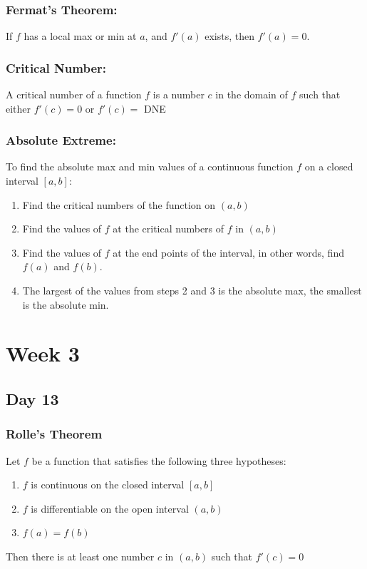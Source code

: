 \documentclass[12pt]{article}
\begin{document}
\subsubsection{Fermat's Theorem:} If $f$ has a local max or min at $a$, and $f'(a)$ exists, then $f'(a) = 0$.

\subsubsection{Critical Number: } A critical number of a function $f$ is a number $c$ in the domain of $f$ such that either $f'(c) = 0$ or $f'(c) = $ DNE

\subsubsection{Absolute Extreme: } To find the absolute max and min values of a continuous function $f$ on a closed interval $[a,b]$: 

\begin{enumerate}
    \item Find the critical numbers of the function on $(a,b)$
    \item Find the values of $f$ at the critical numbers of $f$ in $(a,b)$
    \item Find the values of $f$ at the end points of the interval, in other words, find $f(a)$ and $f(b)$.
    \item The largest of the values from steps 2 and 3 is the absolute max, the smallest is the absolute min.
    
\end{enumerate}

\section{Week 3}
\subsection{Day 13}
\subsubsection{Rolle's Theorem} Let $f$ be a function that satisfies the following three hypotheses:
\begin{enumerate}
    \item $f$ is continuous on the closed interval $[a,b]$
    \item $f$ is differentiable on the open interval $(a,b)$
    \item $f(a) = f(b)$
\end{enumerate}
Then there is at least one number $c$ in $(a,b)$ such that $f'(c) = 0$
\end{document}
